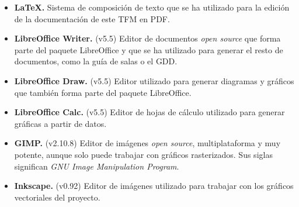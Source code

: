 \begin{itemize}
    \item \textbf{\LaTeX.} Sistema de composición de texto que se ha utilizado para la edición de la documentación de este \acs{TFM} en PDF.
    
    \item \textbf{LibreOffice Writer.} (v5.5) Editor de documentos \textit{open source} que forma parte del paquete LibreOffice y que se ha utilizado para generar el resto de documentos, como la guía de salas o el \acs{GDD}. 
    
    \item \textbf{LibreOffice Draw.} (v5.5) Editor utilizado para generar diagramas y gráficos que también forma parte del paquete LibreOffice.
    
    \item \textbf{LibreOffice Calc.} (v5.5) Editor de hojas de cálculo utilizado para generar gráficas a partir de datos.
    
    \item \textbf{GIMP.} (v2.10.8) Editor de imágenes \textit{open source}, multiplataforma y muy potente, aunque solo puede trabajar con gráficos rasterizados. Sus siglas significan \textit{GNU Image Manipulation Program}.
    
    \item \textbf{Inkscape.} (v0.92) Editor de imágenes utilizado para trabajar con los gráficos vectoriales del proyecto.
\end{itemize}